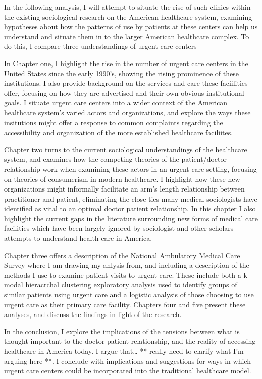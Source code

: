 \documentclass[12pt,twoside]{reedthesis}
\begin{document}
  In the following analysis, I will attempt to situate the rise of such
  clinics within the existing sociological research on the American
  healthcare system, examining hypotheses about how the patterns of use by
  patients at these centers can help us understand and situate them in to
  the larger American healthcare complex. To do this, I compare three
  understandings of urgent care centers
  
  In Chapter one, I highlight the rise in the number of urgent care
  centers in the United States since the early 1990's, showing the rising
  prominence of these institutions. I also provide background on the
  services and care these faciilities offer, focusing on how they are
  advertised and their own obvious institutional goals. I situate urgent
  care centers into a wider context of the American healthcare system's
  varied actors and organizations, and explore the ways these insitutions
  might offer a response to common complaints regarding the accessibility
  and organization of the more established healthcare faciliites.
  
  Chapter two turns to the current sociological understandings of the
  healthcare system, and examines how the competing theories of the
  patient/doctor relationship work when examining these actors in an
  urgent care setting, focusing on theories of consumerism in modern
  healthcare. I highlight how these new organizations might informally
  facilitate an arm's length relationship between practitioner and
  patient, eliminating the close ties many medical sociologists have
  identified as vital to an optimal doctor patient relationship. In this
  chapter I also highlight the current gaps in the literature surrounding
  new forms of medical care facilities which have been largely ignored by
  sociologist and other scholars attempts to understand health care in
  America.
  
  Chapter three offers a description of the National Ambulatory Medical
  Care Survey where I am drawing my anlysis from, and including a
  description of the methods I use to examine patient visits to urgent
  care. These include both a k-modal hieracrchal clustering exploratory
  analysis used to identify groups of similar patients using urgent care
  and a logistic analysis of those choosing to use urgent care as their
  primary care facility. Chapters four and five present these analyses,
  and discuss the findings in light of the research.
  
  In the conclusion, I explore the implications of the tensions between
  what is thought important to the doctor-patient relationship, and the
  reality of accessing healthcare in America today. I argue that\ldots{}
  ** really need to clarify what I'm arguing here **. I conclude with
  implications and suggestions for ways in which urgent care centers could
  be incorporated into the traditional healthcare model.
  
\end{document}
